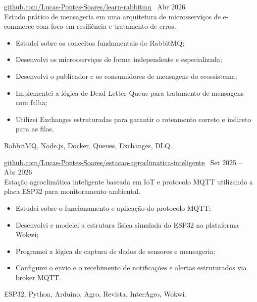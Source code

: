         
 \textbar{}  \href{https://github.com/Lucas-Pontes-Soares/learn-rabbitmq}{github.com/Lucas-Pontes-Soares/learn-rabbitmq} \hfill\ Abr 2026 \\
Estudo prático de mensageria em uma arquitetura de microsserviços de e-commerce com foco em resiliência e tratamento de erros.
\begin{itemize}
    \item Estudei sobre os conceitos fundamentais do RabbitMQ;
    \item Desenvolvi os microsserviços de forma independente e especializada;
    \item Desenvolvi o publicador e os consumidores de mensagens do ecossistema;
    \item Implementei a lógica de Dead Letter Queue para tratamento de mensagens com falha;
    \item Utilizei Exchanges estruturadas para garantir o roteamento correto e indireto para as filas.
\end{itemize}
 RabbitMQ, Node.js, Docker, Queues, Exchanges, DLQ.

        
 \textbar{}  \href{https://github.com/Lucas-Pontes-Soares/estacao-agroclimatica-inteligente}{github.com/Lucas-Pontes-Soares/estacao-agroclimatica-inteligente} \hfill\ Set 2025 -- Abr 2026 \\
Estação agroclimática inteligente baseada em IoT e protocolo MQTT utilizando a placa ESP32 para monitoramento ambiental.
\begin{itemize}
    \item Estudei sobre o funcionamento e aplicação do protocolo MQTT;
    \item Desenvolvi e modelei a estrutura física simulada do ESP32 na plataforma Wokwi;
    \item Programei a lógica de captura de dados de sensores e mensageria;
    \item Configurei o envio e o recebimento de notificações e alertas estruturados via broker MQTT.
\end{itemize}
 ESP32, Python, Arduino, Agro, Revista, InterAgro, Wokwi.

        
